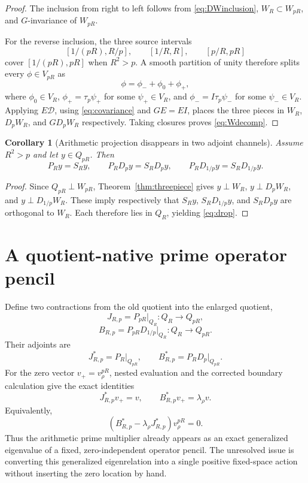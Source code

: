 \documentclass[11pt]{article}
\newtheorem{corollary}[theorem]{Corollary}
\theoremstyle{remark}
\begin{document}
\begin{proof}
The inclusion from right to left follows from \eqref{eq:DWinclusion}, $W_R\subset W_{pR}$, and $G$-invariance of $W_{pR}$.

For the reverse inclusion, the three source intervals
\[
 [1/(pR),R/p],\qquad [1/R,R],\qquad [p/R,pR]
\]
cover $[1/(pR),pR]$ when $R^2>p$. A smooth partition of unity therefore splits every $\phi\in V_{pR}$ as
\[
 \phi=\phi_-+\phi_0+\phi_+,
\]
where $\phi_0\in V_R$, $\phi_+=\tau_p\psi_+$ for some $\psi_+\in V_R$, and $\phi_-=I\tau_p\psi_-$ for some $\psi_-\in V_R$. Applying $E\mathcal D$, using \eqref{eq:covariance} and $GE=EI$, places the three pieces in $W_R$, $D_pW_R$, and $GD_pW_R$ respectively. Taking closures proves \eqref{eq:Wdecomp}.
\end{proof}

\begin{corollary}[Arithmetic projection disappears in two adjoint channels]\label{cor:projectiondrop}
Assume $R^2>p$ and let $y\in Q_{pR}$. Then
\begin{equation}\label{eq:drop}
 P_Ry=S_Ry,\qquad
 P_RD_py=S_RD_py,\qquad
 P_RD_{1/p}y=S_RD_{1/p}y.
\end{equation}
\end{corollary}

\begin{proof}
Since $Q_{pR}\perp W_{pR}$, Theorem~\ref{thm:threepiece} gives
$y\perp W_R$, $y\perp D_pW_R$, and $y\perp D_{1/p}W_R$. These imply respectively that $S_Ry$, $S_RD_{1/p}y$, and $S_RD_py$ are orthogonal to $W_R$. Each therefore lies in $Q_R$, yielding \eqref{eq:drop}.
\end{proof}

\section{A quotient-native prime operator pencil}
Define two contractions from the old quotient into the enlarged quotient,
\[
 J_{R,p}=P_{pR}\big|_{Q_R}:Q_R\to Q_{pR},
\]
\[
 B_{R,p}=P_{pR}D_{1/p}\big|_{Q_R}:Q_R\to Q_{pR}.
\]
Their adjoints are
\[
 J_{R,p}^*=P_R\big|_{Q_{pR}},\qquad
 B_{R,p}^*=P_RD_p\big|_{Q_{pR}}.
\]
For the zero vector $v_+=v_\rho^{pR}$, nested evaluation and the corrected boundary calculation give the exact identities
\begin{equation}\label{eq:pencildual}
 J_{R,p}^*v_+=v,
 \qquad
 B_{R,p}^*v_+=\lambda_\rho v.
\end{equation}
Equivalently,
\begin{equation}\label{eq:pencil}
 (B_{R,p}^*-\lambda_\rho J_{R,p}^*)v_\rho^{pR}=0.
\end{equation}
Thus the arithmetic prime multiplier already appears as an exact generalized eigenvalue of a fixed, zero-independent operator pencil. The unresolved issue is converting this generalized eigenrelation into a single positive fixed-space action without inserting the zero location by hand.
\end{document}
